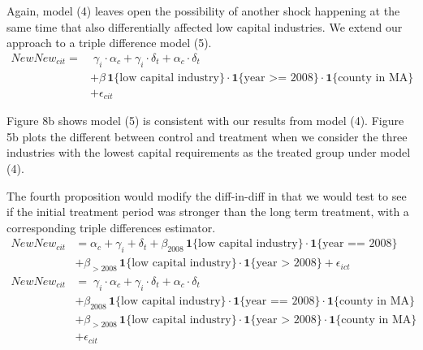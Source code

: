 \documentclass[12pt]{article}
\begin{document}
\begin{comment}

\begin{figure}[H]
	\centering
	\begin{subfigure}[b]{0.495\textwidth}
		\texttt{[image: resources/quantiles.png]}
		\caption{Model (4)}
	\end{subfigure}
	\begin{subfigure}[b]{0.495\textwidth}
		\texttt{[image: resources/quantiles\_ddd.png]}
		\caption{Model (5)}
	\end{subfigure}
	\caption{Treatment Effect By Quantile of Industry's Capital Requirements}
\end{figure}

\end{comment}

Again, model (4) leaves open the possibility of another shock happening at the same time that also differentially affected low capital industries. We extend our approach to a triple difference model (5). 
\begin{align}
NewNew_{cit} = & \; \gamma_i \cdot \alpha_c + \gamma_i \cdot \delta_t +  \alpha_c \cdot \delta_t \nonumber   \\
& + \beta \, \mathbf{1}\{\text{low capital industry}\} \cdot \mathbf{1}\{\text{year >= 2008}\}  \cdot \mathbf{1}\{\text{county in MA}\} \nonumber  \\
& + \epsilon_{cit}
\end{align}

Figure 8b shows model (5) is consistent with our results from model (4). Figure 5b plots the different between control and treatment when we consider the three industries with the lowest capital requirements as the treated group under model (4).  

The fourth proposition would modify the diff-in-diff in that we would test to see if the initial treatment period was stronger than the long term treatment, with a corresponding triple differences estimator.
\begin{align}
NewNew_{cit} & =  \alpha_c + \gamma_i+ \delta_t  \nonumber + \beta_{2008} \, \mathbf{1}\{\text{low capital industry}\} \cdot \mathbf{1}\{\text{year == 2008}\} \nonumber \\
& + \beta_{>2008} \, \mathbf{1}\{\text{low capital industry}\} \cdot \mathbf{1}\{\text{year > 2008}\} + \epsilon_{ict} \\
NewNew_{cit} & =  \; \gamma_i \cdot \alpha_c + \gamma_i \cdot \delta_t +  \alpha_c \cdot \delta_t \nonumber   \\
& + \beta_{2008} \, \mathbf{1}\{\text{low capital industry}\} \cdot \mathbf{1}\{\text{year == 2008}\}  \cdot \mathbf{1}\{\text{county in MA}\} \nonumber  \\
& + \beta_{>2008} \, \mathbf{1}\{\text{low capital industry}\} \cdot \mathbf{1}\{\text{year > 2008}\}  \cdot \mathbf{1}\{\text{county in MA}\} \nonumber  \\
& + \epsilon_{cit}
\end{align}
\end{document}

